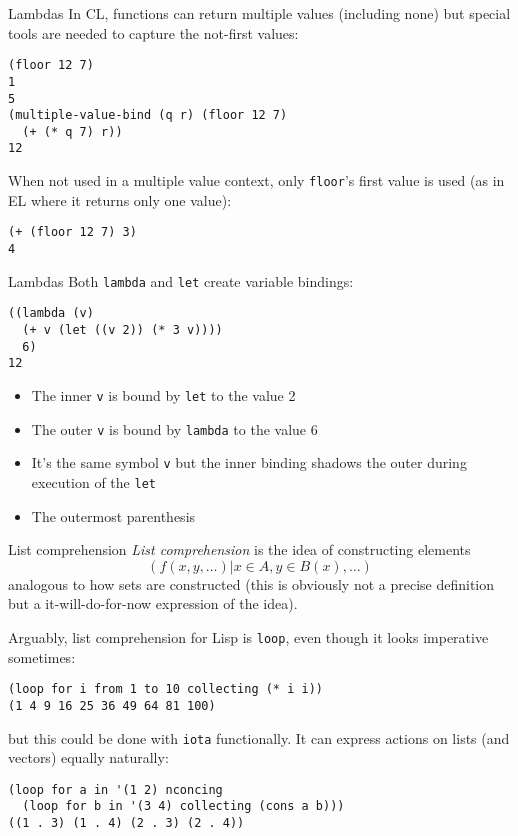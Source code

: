\documentclass[presentation]{beamer}
\begin{document}
\begin{frame}[fragile]{Lambdas}
  In CL, functions can return multiple values (including none) but special tools are needed to capture the not-first values:
\begin{verbatim}
(floor 12 7)
1
5
(multiple-value-bind (q r) (floor 12 7)
  (+ (* q 7) r))
12
\end{verbatim}
When not used in a multiple value context, only \texttt{floor}'s first value is used (as in EL where it returns only one value):
\begin{verbatim}
(+ (floor 12 7) 3)
4
\end{verbatim}
\end{frame}
\begin{frame}[fragile]{Lambdas}
Both \texttt{lambda} and \texttt{let} create variable bindings:
\begin{verbatim}
((lambda (v)
  (+ v (let ((v 2)) (* 3 v))))
  6)
12
\end{verbatim}
\begin{itemize}
\item The inner \texttt{v} is bound by \texttt{let} to the value 2
\item The outer \texttt{v} is bound by \texttt{lambda} to the value 6
\item It's the same symbol \texttt{v} but the inner binding shadows the outer during execution of the \texttt{let}
\item The outermost parenthesis 
\end{itemize}
\end{frame}

\begin{frame}[fragile]{List comprehension}
\emph{List comprehension} is the idea of constructing elements
$$(f(x,y,\ldots)\vert x\in A, y\in B(x),\ldots)$$
analogous to how sets are constructed (this is obviously not a precise definition but a it-will-do-for-now expression of the idea).

\medskip
Arguably, list comprehension for Lisp is \texttt{loop}, even though it looks imperative sometimes:
\begin{verbatim}
(loop for i from 1 to 10 collecting (* i i))
(1 4 9 16 25 36 49 64 81 100)
\end{verbatim}
but this could be done with \texttt{iota} functionally.  It can express actions on lists (and vectors) equally naturally:
\begin{verbatim}
(loop for a in '(1 2) nconcing
  (loop for b in '(3 4) collecting (cons a b)))
((1 . 3) (1 . 4) (2 . 3) (2 . 4))
\end{verbatim}
\end{frame}
\end{document}
